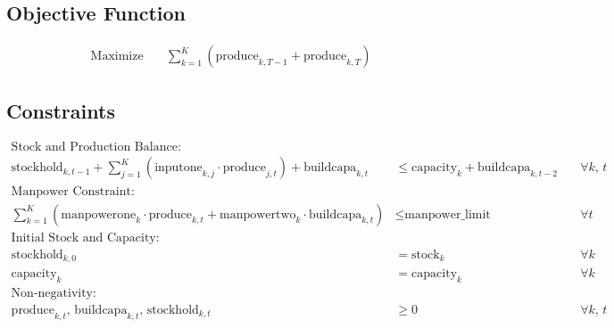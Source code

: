 \documentclass{article}
\begin{document}
\subsection*{Objective Function}
\begin{align*}
\text{Maximize} \quad & \sum_{k=1}^{K} \left(\text{produce}_{k,T-1} + \text{produce}_{k,T}\right)
\end{align*}

\subsection*{Constraints}
\begin{align*}
\text{Stock and Production Balance:} & \\
\text{stockhold}_{k,t-1} + \sum_{j=1}^{K} \left(\text{inputone}_{k,j} \cdot \text{produce}_{j,t}\right) + \text{buildcapa}_{k,t} &\leq \text{capacity}_{k} + \text{buildcapa}_{k,t-2} \quad & \forall k, \, t \\
\text{Manpower Constraint:} & \\
\sum_{k=1}^{K} \left(\text{manpowerone}_{k} \cdot \text{produce}_{k,t} + \text{manpowertwo}_{k} \cdot \text{buildcapa}_{k,t}\right) &\leq \text{manpower\_limit} \quad & \forall t \\
\text{Initial Stock and Capacity:} & \\
\text{stockhold}_{k,0} &= \text{stock}_{k} \quad & \forall k \\
\text{capacity}_{k} &= \text{capacity}_{k} \quad & \forall k \\
\text{Non-negativity:} & \\
\text{produce}_{k,t}, \, \text{buildcapa}_{k,t}, \, \text{stockhold}_{k,t} &\geq 0 \quad & \forall k, \, t
\end{align*}
\end{document}
